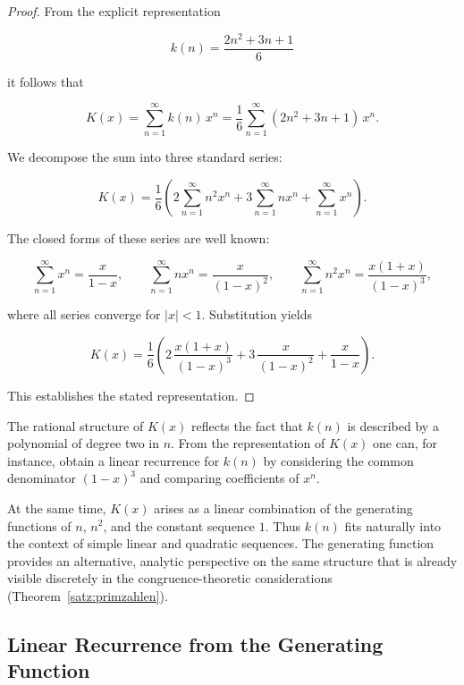 \begin{proof}
From the explicit representation


\[
  k(n) = \frac{2n^{2} + 3n + 1}{6}
\]


it follows that


\[
  K(x)
  = \sum_{n=1}^{\infty} k(n)\,x^{n}
  = \frac{1}{6}\sum_{n=1}^{\infty} (2n^{2} + 3n + 1)\,x^{n}.
\]


We decompose the sum into three standard series:


\[
  K(x)
  = \frac{1}{6}\left(
      2\sum_{n=1}^{\infty} n^{2}x^{n}
      + 3\sum_{n=1}^{\infty} n x^{n}
      + \sum_{n=1}^{\infty} x^{n}
    \right).
\]


The closed forms of these series are well known:


\[
  \sum_{n=1}^{\infty} x^{n} = \frac{x}{1-x}, \qquad
  \sum_{n=1}^{\infty} n x^{n} = \frac{x}{(1-x)^{2}}, \qquad
  \sum_{n=1}^{\infty} n^{2} x^{n} = \frac{x(1+x)}{(1-x)^{3}},
\]


where all series converge for $|x|<1$. Substitution yields


\[
  K(x)
  = \frac{1}{6}\left(
      2\,\frac{x(1+x)}{(1-x)^{3}}
      + 3\,\frac{x}{(1-x)^{2}}
      + \frac{x}{1-x}
    \right).
\]


This establishes the stated representation.
\end{proof}

\begin{bemerkung}
The rational structure of $K(x)$ reflects the fact that $k(n)$ is described by a polynomial of degree two in $n$. From the representation of $K(x)$ one can, for instance, obtain a linear recurrence for $k(n)$ by considering the common denominator $(1-x)^{3}$ and comparing coefficients of $x^{n}$. 

At the same time, $K(x)$ arises as a linear combination of the generating functions of $n$, $n^{2}$, and the constant sequence $1$. Thus $k(n)$ fits naturally into the context of simple linear and quadratic sequences. The generating function provides an alternative, analytic perspective on the same structure that is already visible discretely in the congruence-theoretic considerations (Theorem~\ref{satz:primzahlen}).
\end{bemerkung}

\subsection{Linear Recurrence from the Generating Function}

